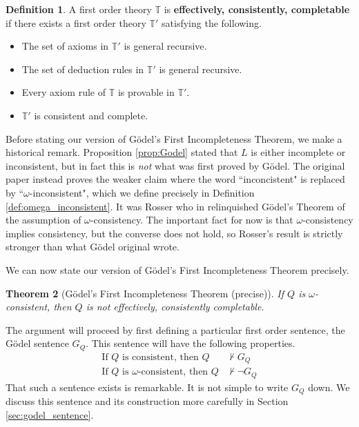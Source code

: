 \documentclass[12pt]{article}
\theoremstyle{plain}
\newtheorem{thm}{Theorem}[subsection] %
\theoremstyle{definition}
\newtheorem{defn}[thm]{Definition} %
\newcommand{\bb}[1]{\mathbb{#1}}
\begin{document}
	\begin{defn}
		A first order theory $\bb{T}$ is \textbf{effectively, consistently, completable} if there exists a first order theory $\bb{T}'$ satisfying the following.
		\begin{itemize}
			\item The set of axioms in $\bb{T}'$ is general recursive.
			\item The set of deduction rules in $\bb{T}'$ is general recursive.
			\item Every axiom rule of $\bb{T}$ is provable in $\bb{T}'$.
			\item $\bb{T}'$ is consistent and complete.
		\end{itemize}
	\end{defn}
	Before stating our version of G\"{o}del's First Incompleteness Theorem, we make a historical remark. Proposition \ref{prop:Godel} stated that $L$ is either incomplete or inconsistent, but in fact this is \emph{not} what was first proved by G\"{o}del. The original paper \cite{Godel} instead proves the weaker claim where the word ``inconcistent" is replaced by ``$\omega$-inconsistent", which we define precisely in Definition \ref{def:omega_inconsistent}. It was Rosser who in \cite{Rosser} relinquished G\"{o}del's Theorem of the assumption of $\omega$-consistency. The important fact for now is that $\omega$-consistency implies consistency, but the converse does not hold, so Rosser's result is strictly stronger than what G\"{o}del original wrote.
	
	We can now state our version of G\"{o}del's First Incompleteness Theorem precisely.
	\begin{thm}[G\"{o}del's First Incompleteness Theorem (precise)]
		If $Q$ is $\omega$-consistent, then $Q$ is not effectively, consistently completable.
	\end{thm}
	The argument will proceed by first defining a particular first order sentence, the G\"{o}del sentence $G_Q$. This sentence will have the following properties.
	\begin{align}
		\text{If }Q\text{ is consistent, then }Q &\not\vdash G_Q\label{eq:consistent}\\
		\text{If }Q\text{ is }\omega\text{-consistent, then }Q &\not\vdash \neg G_Q\label{eq:omega_consistent}
	\end{align}
That such a sentence exists is remarkable. It is not simple to write $G_Q$ down. We discuss this sentence and its construction more carefully in Section \ref{sec:godel_sentence}.
	
\end{document}
